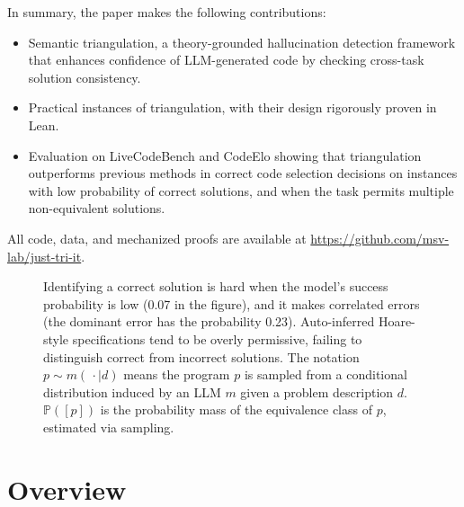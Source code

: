 \documentclass[acmsmall,screen,nonacm]{acmart}
\begin{document}
In summary, the paper makes the following contributions:
\begin{itemize}
\item Semantic triangulation, a theory-grounded hallucination detection framework that enhances confidence of LLM-generated code by checking cross-task solution consistency.
\item Practical instances of triangulation, with their design rigorously proven in Lean.
\item Evaluation on LiveCodeBench and CodeElo showing that triangulation outperforms previous methods in correct code selection decisions on instances with low probability of correct solutions, and when the task permits multiple non-equivalent solutions.
\end{itemize}

All code, data, and mechanized proofs are available at \url{https://github.com/msv-lab/just-tri-it}.


\begin{figure}[t]
  \centering
  
  \caption{Identifying a correct solution is hard when the model's success probability is low (0.07 in the figure), and it makes correlated errors (the dominant error has the probability 0.23). Auto-inferred Hoare-style specifications tend to be overly permissive, failing to distinguish correct from incorrect solutions. The notation $p \sim m(\,\cdot \mid d)$ means the program $p$ is sampled from a conditional distribution induced by an LLM $m$ given a problem description $d$. $\mathds{P}([p])$ is the probability mass of the equivalence class of $p$, estimated via sampling.\label{fig:problem}}
\end{figure}%


\section{Overview}
\end{document}

